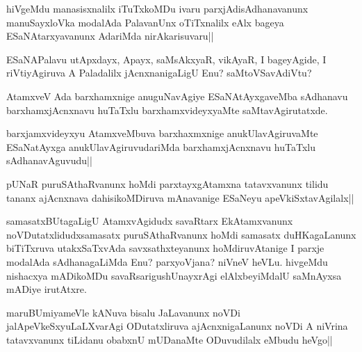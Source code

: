 \begin{artha}
hiVgeMdu manasisxnalilx iTuTxkoMDu ivaru parxjAdisAdhanavanunx manuSayxloVka modalAda PalavanUnx oTiTxnalilx eAlx bageya ESaNAtarxyavanunx AdariMda nirAkarisuvaru||
\end{artha}


\begin{artha}
ESaNAPalavu utApxdayx, Apayx, saMsAkxyaR, vikAyaR, I bageyAgide, I riVtiyAgiruva A Paladalilx jAcnxnanigaLigU Enu? saMtoVSavAdiVtu?
\end{artha}


\begin{artha}
AtamxveV Ada barxhamxnige anuguNavAgiye ESaNAtAyxgaveMba sAdhanavu barxhamxjAcnxnavu huTaTxlu barxhamxvideyxyaMte saMtavAgirutatxde.	
\end{artha}


\begin{artha}
barxjamxvideyxyu AtamxveMbuva barxhaxmxnige anukUlavAgiruvaMte ESaNatAyxga anukUlavAgiruvudariMda barxhamxjAcnxnavu huTaTxlu sAdhanavAguvudu||
\end{artha}

\begin{artha}
pUNaR puruSAthaRvanunx hoMdi parxtayxgAtamxna tatavxvanunx tilidu tananx ajAcnxnava dahisikoMDiruva mAnavanige ESaNeyu apeVkiSxtavAgilalx||
\end{artha}

\begin{artha}
samasatxBUtagaLigU AtamxvAgidudx savaRtarx EkAtamxvanunx noVDutatxlidudxsamasatx puruSAthaRvanunx hoMdi samasatx duHKagaLanunx biTiTxruva utakxSaTxvAda savxsathxteyanunx hoMdiruvAtanige I parxje modalAda sAdhanagaLiMda Enu? parxyoVjana? niVneV heVLu. hivgeMdu nishacxya mADikoMDu savaRsarigushUnayxrAgi elAlxbeyiMdalU saMnAyxsa mADiye irutAtxre.
\end{artha}


\begin{artha}
maruBUmiyameVle kANuva bisalu JaLavanunx noVDi jalApeVkeSxyuLaLXvarAgi ODutatxliruva ajAcnxnigaLanunx noVDi A niVrina tatavxvanunx tiLidanu obabxnU mUDanaMte ODuvudilalx eMbudu heVgo||
\end{artha}

